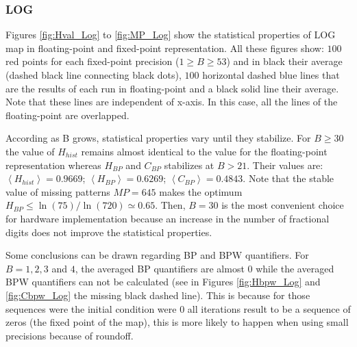 \subsubsection{LOG} \label{subsubsec:log}

Figures \ref{fig:Hval_Log} to \ref{fig:MP_Log} show the statistical properties of LOG map in floating-point and fixed-point representation.
All these figures show: $100$ red points for each fixed-point precision ($1\geq B \geq 53$) and in black their average (dashed black line connecting black dots), $100$ horizontal dashed blue lines that are the results of each run in floating-point and a black solid line their average.
Note that these lines are independent of x-axis.
In this case, all the lines of the floating-point are overlapped.

According as B grows, statistical properties vary until they stabilize.
For $B\geq 30$ the value of $H_{hist}$ remains almost identical to the value for the floating-point representation whereas $H_{BP}$ and $C_{BP}$ stabilizes at $B>21$.
Their values are: $\left\langle H_{hist}\right\rangle =0.9669$; $\left\langle H_{BP}\right\rangle =0.6269$; $\left\langle C_{BP}\right\rangle=0.4843$.
Note that the stable value of missing patterns $MP=645$ makes the optimum $H_{BP} \leq \ln(75)/\ln(720) \simeq 0.65$.
Then, $B=30$ is the most convenient choice for hardware implementation because an increase in the number of fractional digits does not improve the statistical properties.

Some conclusions can be drawn regarding BP and BPW quantifiers.
For $B=1, 2, 3$ and $4$, the averaged BP quantifiers are almost $0$ while the averaged BPW quantifiers can not be calculated (see in Figures \ref{fig:Hbpw_Log} and \ref{fig:Cbpw_Log} the missing black dashed line).
This is because for those sequences were the initial condition were $0$ all iterations result to be a sequence of zeros (the fixed point of the map), this is more likely to happen when using small precisions because of roundoff.

